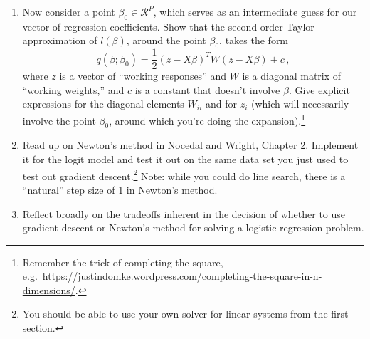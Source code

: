 \documentclass{article}
\begin{document}
\begin{enumerate}[label=(\Alph*)]
\item Now consider a point $\beta_0 \in \mathcal{R}^P$, which serves as an intermediate guess for our vector of regression coefficients.  Show that the second-order Taylor approximation of $l(\beta)$, around the point $\beta_0$, takes the form
$$
q(\beta; \beta_0) = \frac{1}{2}(z - X \beta)^T W (z - X \beta) + c\, ,
$$
where $z$ is a vector of ``working responses'' and $W$ is a diagonal matrix of ``working weights,'' and $c$ is a constant that doesn't involve $\beta$.  Give explicit expressions for the diagonal elements $W_{ii}$ and for $z_i$ (which will necessarily involve the point $\beta_0$, around which you're doing the expansion).\footnote{Remember the trick of completing the square, e.g.~\url{https://justindomke.wordpress.com/completing-the-square-in-n-dimensions/}.}

\item Read up on Newton's method in Nocedal and Wright, Chapter 2.  Implement it for the logit model and test it out on the same data set you just used to test out gradient descent.\footnote{You should be able to use your own solver for linear systems from the first section.}  Note: while you could do line search, there is a ``natural'' step size of 1 in Newton's method.

\item Reflect broadly on the tradeoffs inherent in the decision of whether to use gradient descent or Newton's method for solving a logistic-regression problem.




\end{enumerate}
\end{document}
